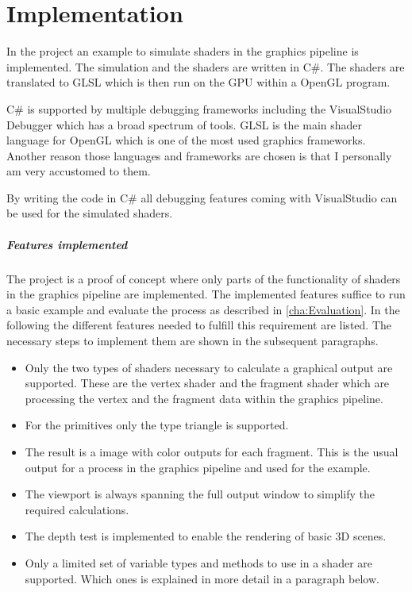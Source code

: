 
\chapter{Implementation}\label{cha:Implementation}

In the project  an example to simulate shaders in the graphics pipeline is implemented. The simulation and the shaders are written in C\#. The shaders are translated to GLSL which is then run on the GPU within a OpenGL program.

C\# is supported by multiple debugging frameworks including the VisualStudio Debugger which has a broad spectrum of tools.  GLSL is the main shader language for OpenGL which is one of the most used graphics frameworks. 
Another reason those languages and frameworks are chosen is that I personally am very accustomed to them.

By writing the code in C\# all debugging features coming with VisualStudio can be used for the simulated shaders.

\paragraph{Features implemented}

The project is a proof of concept where only parts of the functionality of shaders in the graphics pipeline are implemented. The implemented features suffice to run a basic example and evaluate the process as described in \autoref{cha:Evaluation}. In the following the different features needed to fulfill this requirement are listed. The necessary steps to implement them are shown in the subsequent paragraphs.

\begin{itemize}
\item Only the two types of shaders necessary to calculate a graphical output are supported. These are the vertex shader and the fragment shader which are processing the vertex and the fragment data within the graphics pipeline.
\item For the primitives only the type triangle is supported.
\item The result is a image with color outputs for each fragment. This is the usual output for a process in the graphics pipeline and used for the example.
\item The viewport is always spanning the full output window to simplify the required calculations.
\item The depth test is implemented to enable the rendering of basic 3D scenes.
\item Only a limited set of variable types and methods to use in a shader are supported. Which ones is explained in more detail in a paragraph below.
\end{itemize}

